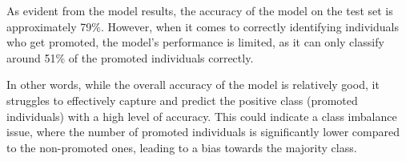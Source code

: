 \documentclass[11pt,]{article}
\newenvironment{Shaded}{\begin{snugshade}}{\end{snugshade}}
\newcommand{\AttributeTok}[1]{\textcolor[rgb]{0.13,0.29,0.53}{#1}}
\newcommand{\CommentTok}[1]{\textcolor[rgb]{0.56,0.35,0.01}{\textit{#1}}}
\newcommand{\ControlFlowTok}[1]{\textcolor[rgb]{0.13,0.29,0.53}{\textbf{#1}}}
\newcommand{\DecValTok}[1]{\textcolor[rgb]{0.00,0.00,0.81}{#1}}
\newcommand{\DocumentationTok}[1]{\textcolor[rgb]{0.56,0.35,0.01}{\textbf{\textit{#1}}}}
\newcommand{\FunctionTok}[1]{\textcolor[rgb]{0.13,0.29,0.53}{\textbf{#1}}}
\newcommand{\NormalTok}[1]{#1}
\newcommand{\OtherTok}[1]{\textcolor[rgb]{0.56,0.35,0.01}{#1}}
\newcommand{\SpecialCharTok}[1]{\textcolor[rgb]{0.81,0.36,0.00}{\textbf{#1}}}
\newcommand{\StringTok}[1]{\textcolor[rgb]{0.31,0.60,0.02}{#1}}
\begin{document}
\begin{Shaded}
\end{Shaded}

As evident from the model results, the accuracy of the model on the test
set is approximately 79\%. However, when it comes to correctly
identifying individuals who get promoted, the model's performance is
limited, as it can only classify around 51\% of the promoted individuals
correctly.

In other words, while the overall accuracy of the model is relatively
good, it struggles to effectively capture and predict the positive class
(promoted individuals) with a high level of accuracy. This could
indicate a class imbalance issue, where the number of promoted
individuals is significantly lower compared to the non-promoted ones,
leading to a bias towards the majority class.
\end{document}
